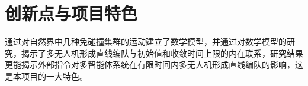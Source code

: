 
\section{创新点与项目特色}

通过对自然界中几种免碰撞集群的运动建立了数学模型，并通过对数学模型的研究，揭示了多无人机形成直线编队与初始值和收敛时间上限的内在联系，研究结果更能揭示外部指令对多智能体系统在有限时间内多无人机形成直线编队的影响，这是本项目的一大特色。